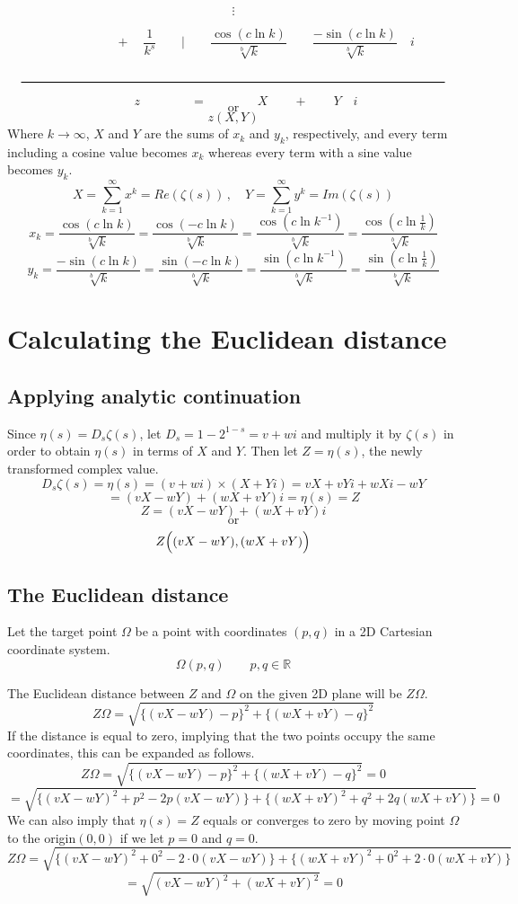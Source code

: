 \documentclass{amsart}
\begin{document}
	\[ \vdots \]
	
	\[ \qquad \qquad \quad + \quad \frac{1}{k^s} \qquad \Big|  \qquad \frac{\cos({c\ln k})}{\sqrt[b]{k}} \qquad \frac{-\sin({c\ln k})}{\sqrt[b]{k}} \quad i  \]
	
	\[\quad \rule{12 cm}{.8pt} \quad \]
	\[ \qquad \qquad \qquad z \qquad\qquad =  \qquad\qquad X \qquad + \qquad Y \quad i \qquad\qquad \]
	\[ \text{or} \]
	\[ z (X, Y) \]
	\[\]
	Where $k \to \infty$, $X$ and $Y$ are the sums of $x_k$ and $y_k$, respectively, and every term including a cosine value becomes $x_k$ whereas every term with a sine value becomes $y_k$. 
	\[ X = \sum\limits_{k=1}^{\infty}x^k = Re(\zeta(s)) \, , \quad Y = \sum\limits_{k=1}^{\infty}y^k = Im(\zeta(s)) \]
	\[\]
	\[ x_k = \frac{\cos({c\ln k})}{\sqrt[b]{k}} = \frac{\cos(-{c\ln k})}{\sqrt[b]{k}} = \frac{\cos({c\ln k^{-1}})}{\sqrt[b]{k}} = \frac{\cos({c\ln \frac{1}{k}})}{\sqrt[b]{k}} \]
	\[ y_k = \frac{-\sin({c\ln k})}{\sqrt[b]{k}} = \frac{\sin({-c\ln k})}{\sqrt[b]{k}} = \frac{\sin({c\ln k^{-1}})}{\sqrt[b]{k}} = \frac{\sin({c\ln \frac1k })}{\sqrt[b]{k}} \]
	
	
	
	
	
	
	
	\section{Calculating the Euclidean distance}
	\subsection{Applying analytic continuation}
	Since $\eta(s) = D_s\zeta(s)$, let $D_s = 1-2^{1-s}=v+wi$ and multiply it by $\zeta(s)$ in order to obtain $\eta(s)$ in terms of $X$ and $Y$. Then let $Z = \eta(s)$, the newly transformed complex value.
	\[ D_s\zeta(s) = \eta(s) = (v+wi) \times (X+Yi) = vX + vYi + wXi - wY  \]
	\[ = (vX - wY) + (wX + vY)i = \eta(s) = Z \]
	\[ Z = (vX - wY) + (wX + vY)i \]
	\[ \text{or} \]
	\[ Z \Bigl( (vX - wY), (wX + vY) \Bigr) \]
	
	\subsection{The Euclidean distance}
	Let the target point $\Omega$ be a point with coordinates $(p,q)$ in a 2D Cartesian coordinate system.
	\[ \Omega(p, q) \qquad p,q \in \mathbb{R} \]

	The Euclidean distance between $Z$ and $\Omega$ on the given 2D plane will be $Z\Omega$.
	\[ Z\Omega = \sqrt{\{(vX-wY)-p\}^2 + \{(wX+vY)-q\}^2} \]
	If the distance is equal to zero, implying that the two points occupy the same coordinates, this can be expanded as follows.
	\[ Z\Omega = \sqrt{\{(vX-wY)-p\}^2 + \{(wX+vY)-q\}^2} = 0 \]
	\[ = \sqrt{\{ (vX-wY)^2 {+} p^2 -2p(vX-wY) \} {+} \{ (wX{+}vY)^2 {+} q^2 {+} 2q(wX{+}vY) \}} = 0 \]
	We can also imply that $\eta(s)=Z$ equals or converges to zero by moving point $\Omega$ to the origin$(0,0)$ if we let $p=0$ and $q=0$.
	\[ Z\Omega = \sqrt{\{ (vX-wY)^2 {+} 0^2 -2 \cdot 0 (vX-wY) \} {+} \{ (wX{+}vY)^2 {+} 0^2 {+} 2 \cdot 0 (wX{+}vY) \}} \]
	\[ = \sqrt{(vX-wY)^2 {+} (wX{+}vY)^2} = 0 \]
	
\end{document}
